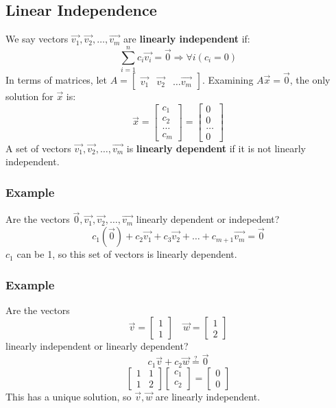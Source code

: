 \documentclass[letterpaper, 12pt]{math}
\begin{document}
\subsection*{Linear Independence}
We say vectors \( \vec{v_1},\vec{v_2},\dots,\vec{v_m} \) are \textbf{linearly
independent} if:
\[ \sum_{i=1}^{n}c_i\vec{v_i} = \vec{0} \Rightarrow \forall{i}(c_i = 0) \]
In terms of matrices, let \( A = \begin{bmatrix}\vec{v_1} & \vec{v_2} & \dots
\vec{v_m}\end{bmatrix} \). Examining \( A\vec{x} = \vec{0} \), the only
solution for \( \vec{x} \) is:
\[ \vec{x} = \begin{bmatrix}c_1 \\ c_2 \\ \dots \\ c_m\end{bmatrix} =
  \begin{bmatrix} 0 \\ 0 \\ \dots \\ 0\end{bmatrix} \]
A set of vectors \( \vec{v_1},\vec{v_2},\dots,\vec{v_m} \) is \textbf{linearly
dependent} if it is not linearly independent.

\subsubsection*{Example}
Are the vectors \( \vec{0},\vec{v_1},\vec{v_2},\dots,\vec{v_m} \) linearly
dependent or indepedent?
\[ c_1(\vec{0})+c_2\vec{v_1}+c_3\vec{v_2}+\dots+c_{m+1}\vec{v_m} = \vec{0} \]
\( c_1 \) can be 1, so this set of vectors is linearly dependent.

\subsubsection*{Example}
Are the vectors
\[ \vec{v} = \begin{bmatrix}1 \\ 1\end{bmatrix}\quad
  \vec{w} = \begin{bmatrix}1 \\ 2\end{bmatrix} \]
linearly independent or linearly dependent?
\[ c_1\vec{v}+c_2\vec{w} \stackrel{?}{=} \vec{0} \]
\[ \begin{bmatrix}1 & 1 \\ 1 & 2\end{bmatrix}
  \begin{bmatrix}c_1 \\ c_2\end{bmatrix} =
  \begin{bmatrix}0 \\ 0\end{bmatrix} \]
This has a unique solution, so \( \vec{v},\vec{w} \) are linearly independent.
\end{document}
